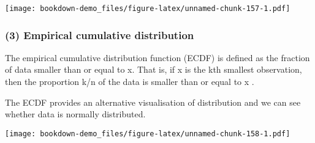 \documentclass[]{book}
\newenvironment{Shaded}{\begin{snugshade}}{\end{snugshade}}
\newcommand{\KeywordTok}[1]{\textcolor[rgb]{0.13,0.29,0.53}{\textbf{#1}}}
\newcommand{\DataTypeTok}[1]{\textcolor[rgb]{0.13,0.29,0.53}{#1}}
\newcommand{\DecValTok}[1]{\textcolor[rgb]{0.00,0.00,0.81}{#1}}
\newcommand{\StringTok}[1]{\textcolor[rgb]{0.31,0.60,0.02}{#1}}
\newcommand{\CommentTok}[1]{\textcolor[rgb]{0.56,0.35,0.01}{\textit{#1}}}
\newcommand{\OperatorTok}[1]{\textcolor[rgb]{0.81,0.36,0.00}{\textbf{#1}}}
\newcommand{\NormalTok}[1]{#1}
\theoremstyle{definition}
\theoremstyle{definition}
\theoremstyle{definition}
\theoremstyle{remark}
\begin{document}
\texttt{[image: bookdown-demo\_files/figure-latex/unnamed-chunk-157-1.pdf]}

\subsubsection{(3) Empirical cumulative
distribution}\label{empirical-cumulative-distribution}

The empirical cumulative distribution function (ECDF) is defined as the
fraction of data smaller than or equal to x. That is, if x is the kth
smallest observation, then the proportion k/n of the data is smaller
than or equal to x .

The ECDF provides an alternative visualisation of distribution and we
can see whether data is normally distributed.

\begin{Shaded}
\end{Shaded}

\texttt{[image: bookdown-demo\_files/figure-latex/unnamed-chunk-158-1.pdf]}

\begin{Shaded}
\end{Shaded}
\end{document}
